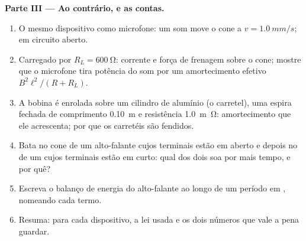 \begin{problem}
\medskip
\noindent\textbf{Parte III --- Ao contrário, e as contas.}
\begin{enumerate}[resume]
  \item O mesmo dispositivo como microfone: um som move o cone a
        $v = \qty{1.0}{mm/s}$;  em circuito aberto.
  \item Carregado por $R_L = \qty{600}{\ohm}$: corrente e força de frenagem
        sobre o cone; mostre que o microfone tira potência do som
        por um amortecimento efetivo $B^2\ell^2/(R + R_L)$.
  \item A bobina é enrolada sobre um cilindro de alumínio (o carretel), uma
        espira fechada de comprimento \qty{0.10}{m} e resistência \qty{1.0}{m\ohm}:
        amortecimento que ele acrescenta; por que os carretéis são fendidos.
  \item Bata no cone de um alto-falante cujos terminais estão em aberto e depois
        no de um cujos terminais estão em curto: qual dos dois soa por mais tempo,
        e por quê?
  \item Escreva o balanço de energia do alto-falante ao longo de um período em
        , nomeando cada termo.
  \item Resuma: para cada dispositivo, a lei usada e os dois números
        que vale a pena guardar.
\end{enumerate}
\end{problem}
